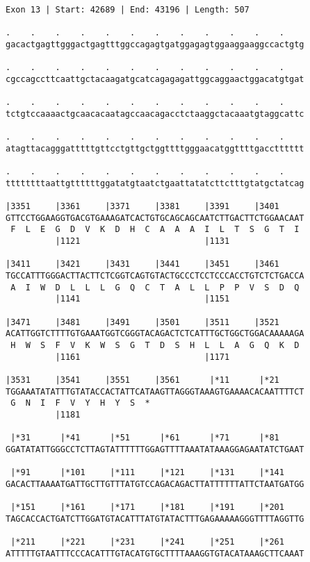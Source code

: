 \documentclass{article}
\begin{document}
\newpage
\begin{Verbatim}
Exon 13 | Start: 42689 | End: 43196 | Length: 507
 
.    .    .    .    .    .    .    .    .    .    .    .    
gacactgagttgggactgagtttggccagagtgatggagagtggaaggaaggccactgtg
  
.    .    .    .    .    .    .    .    .    .    .    .    
cgccagccttcaattgctacaagatgcatcagagagattggcaggaactggacatgtgat
  
.    .    .    .    .    .    .    .    .    .    .    .    
tctgtccaaaactgcaacacaatagccaacagacctctaaggctacaaatgtaggcattc
  
.    .    .    .    .    .    .    .    .    .    .    .    
atagttacagggatttttgttcctgttgctggttttgggaacatggttttgacctttttt
  
.    .    .    .    .    .    .    .    .    .    .    .    
ttttttttaattgttttttggatatgtaatctgaattatatcttctttgtatgctatcag
  
|3351     |3361     |3371     |3381     |3391     |3401     
GTTCCTGGAAGGTGACGTGAAAGATCACTGTGCAGCAGCAATCTTGACTTCTGGAACAAT
 F  L  E  G  D  V  K  D  H  C  A  A  A  I  L  T  S  G  T  I 
          |1121                         |1131               
  
|3411     |3421     |3431     |3441     |3451     |3461     
TGCCATTTGGGACTTACTTCTCGGTCAGTGTACTGCCCTCCTCCCACCTGTCTCTGACCA
 A  I  W  D  L  L  L  G  Q  C  T  A  L  L  P  P  V  S  D  Q 
          |1141                         |1151               
  
|3471     |3481     |3491     |3501     |3511     |3521     
ACATTGGTCTTTTGTGAAATGGTCGGGTACAGACTCTCATTTGCTGGCTGGACAAAAAGA
 H  W  S  F  V  K  W  S  G  T  D  S  H  L  L  A  G  Q  K  D 
          |1161                         |1171               
  
|3531     |3541     |3551     |3561      |*11      |*21     
TGGAAATATATTTGTATACCACTATTCATAAGTTAGGGTAAAGTGAAAACACAATTTTCT
 G  N  I  F  V  Y  H  Y  S  *   
          |1181                                             
  
 |*31      |*41      |*51      |*61      |*71      |*81     
GGATATATTGGGCCTCTTAGTATTTTTTGGAGTTTTAAATATAAAGGAGAATATCTGAAT
  
 |*91      |*101     |*111     |*121     |*131     |*141    
GACACTTAAAATGATTGCTTGTTTATGTCCAGACAGACTTATTTTTTATTCTAATGATGG
  
 |*151     |*161     |*171     |*181     |*191     |*201    
TAGCACCACTGATCTTGGATGTACATTTATGTATACTTTGAGAAAAAGGGTTTTAGGTTG
  
 |*211     |*221     |*231     |*241     |*251     |*261    
ATTTTTGTAATTTCCCACATTTGTACATGTGCTTTTAAAGGTGTACATAAAGCTTCAAAT
  

\end{Verbatim}
\end{document}

